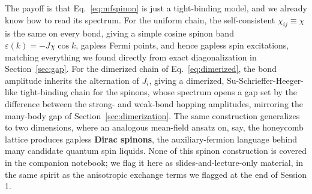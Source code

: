 \documentclass[all_sessions.tex]{subfiles}
\begin{document}
The payoff is that Eq.~\eqref{eq:mfspinon} is just a tight-binding model, and we already know how to read
its spectrum. For the uniform chain, the self-consistent $\chi_{ij}\equiv\chi$ is the same on every bond,
giving a simple cosine spinon band $\varepsilon(k) = -J\chi\cos k$, gapless Fermi points, and hence
gapless spin excitations, matching everything we found directly from exact diagonalization in
Section~\ref{sec:gap}. For the dimerized chain of Eq.~\eqref{eq:dimerized}, the bond amplitude inherits
the alternation of $J_i$, giving a dimerized, Su-Schrieffer-Heeger-like tight-binding chain for the
spinons, whose spectrum opens a gap set by the difference between the strong- and weak-bond hopping
amplitudes, mirroring the many-body gap of Section~\ref{sec:dimerization}. The same construction
generalizes to two dimensions, where an analogous mean-field ansatz on, say, the honeycomb lattice
produces gapless \textbf{Dirac spinons}, the auxiliary-fermion language behind many candidate quantum
spin liquids. None of this spinon construction is covered in the companion notebook; we flag it here as
slides-and-lecture-only material, in the same spirit as the anisotropic exchange terms we flagged at the
end of Session 1.
\end{document}

